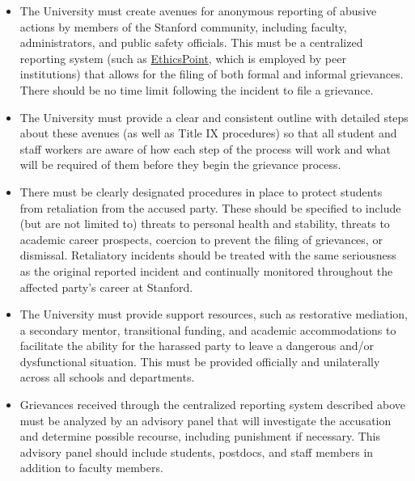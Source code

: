 \documentclass[12pt, titlepage, letterpaper]{article}
\begin{document}
\begin{itemize}
    \item The University must create avenues for anonymous reporting of abusive actions by members of the Stanford community, including faculty, administrators, and public safety officials. This must be a centralized reporting system (such as \href{https://secure.ethicspoint.com/domain/media/en/gui/7325/index.html}{EthicsPoint}, which is employed by peer institutions) that allows for the filing of both formal and informal grievances. There should be no time limit following the incident to file a grievance.
    \item The University must provide a clear and consistent outline with detailed steps about these avenues (as well as Title IX procedures) so that all student and staff workers are aware of how each step of the process will work and what will be required of them before they begin the grievance process.
    \item There must be clearly designated procedures in place to protect students from retaliation from the accused party. These should be specified to include (but are not limited to) threats to personal health and stability, threats to academic career prospects, coercion to prevent the filing of grievances, or dismissal. Retaliatory incidents should be treated with the same seriousness as the original reported incident and continually monitored throughout the affected party’s career at Stanford. 
    \item The University must provide support resources, such as restorative mediation, a secondary mentor, transitional funding, and academic accommodations to facilitate the ability for the harassed party to leave a dangerous and/or dysfunctional situation. This must be provided officially and unilaterally across all schools and departments. 
    \item Grievances received through the centralized reporting system described above must be analyzed by an advisory panel that will investigate the accusation and determine possible recourse, including punishment if necessary. This advisory panel should include students, postdocs, and staff members in addition to faculty members.
\end{itemize}
\end{document}

